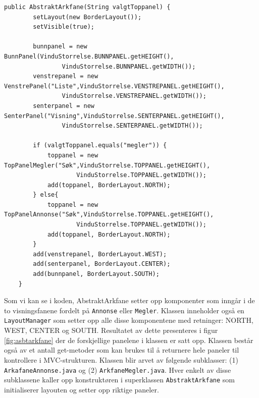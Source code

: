 \begin{lstlisting}[caption=Konstruktør til \texttt{AbstraktArkfane}.,label=kode:arkfane]
    public AbstraktArkfane(String valgtToppanel) {
        setLayout(new BorderLayout());
        setVisible(true);
        
        bunnpanel = new BunnPanel(VinduStorrelse.BUNNPANEL.getHEIGHT(), 
                VinduStorrelse.BUNNPANEL.getWIDTH());
        venstrepanel = new VenstrePanel("Liste",VinduStorrelse.VENSTREPANEL.getHEIGHT(), 
                VinduStorrelse.VENSTREPANEL.getWIDTH());
        senterpanel = new SenterPanel("Visning",VinduStorrelse.SENTERPANEL.getHEIGHT(), 
                VinduStorrelse.SENTERPANEL.getWIDTH());

        if (valgtToppanel.equals("megler")) {
            toppanel = new TopPanelMegler("Søk",VinduStorrelse.TOPPANEL.getHEIGHT(), 
                    VinduStorrelse.TOPPANEL.getWIDTH());
            add(toppanel, BorderLayout.NORTH);
        } else{
            toppanel = new TopPanelAnnonse("Søk",VinduStorrelse.TOPPANEL.getHEIGHT(), 
                    VinduStorrelse.TOPPANEL.getWIDTH());
            add(toppanel, BorderLayout.NORTH);
        }
        add(venstrepanel, BorderLayout.WEST);
        add(senterpanel, BorderLayout.CENTER);
        add(bunnpanel, BorderLayout.SOUTH);
    }
\end{lstlisting}



Som vi kan se i koden, AbstraktArkfane setter opp komponenter som inngår i de to visningsfanene fordelt på \texttt{Annonse} eller \texttt{Megler}. Klassen inneholder også en \texttt{LayoutManager} som setter opp alle disse komponentene med retninger: NORTH, WEST, CENTER og SOUTH. Resultatet av dette presenteres i figur \ref{fig:asbtarkfane} der de forskjellige panelene i klassen er satt opp. Klassen består også av et antall get-metoder som kan brukes til å returnere hele paneler til kontrollere i MVC-strukturen. Klassen blir arvet av følgende subklasser: (1) \texttt{ArkafaneAnnonse.java} og (2) \texttt{ArkfaneMegler.java}. Hver enkelt av disse subklassene kaller opp konstruktøren i superklassen \texttt{AbstraktArkfane} som initialiserer layouten og setter opp riktige paneler.




